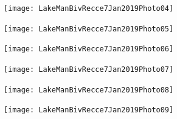 \documentclass[12pt]{article} %
\begin{document}
\begin{figure}[ht]
\begin{minipage}{.5\linewidth}
\begin{flushleft}
   \texttt{[image: LakeManBivRecce7Jan2019Photo04]}
\end{flushleft}
\end{minipage}
\begin{minipage}{.5\linewidth}
\begin{flushright}
   \texttt{[image: LakeManBivRecce7Jan2019Photo05]}
\end{flushright}
\end{minipage}
\end{figure}

\begin{figure}[ht]
\begin{minipage}{.5\linewidth}
\begin{flushleft}
   \texttt{[image: LakeManBivRecce7Jan2019Photo06]}
\end{flushleft}
\end{minipage}
\begin{minipage}{.5\linewidth}
\begin{flushright}
   \texttt{[image: LakeManBivRecce7Jan2019Photo07]}
\end{flushright}
\end{minipage}
\end{figure}

\begin{figure}[ht]
\begin{minipage}{.5\linewidth}
\begin{flushleft}
   \texttt{[image: LakeManBivRecce7Jan2019Photo08]}
\end{flushleft}
\end{minipage}
\begin{minipage}{.5\linewidth}
\begin{flushright}
   \texttt{[image: LakeManBivRecce7Jan2019Photo09]}
\end{flushright}
\end{minipage}
\end{figure}
\end{document}

